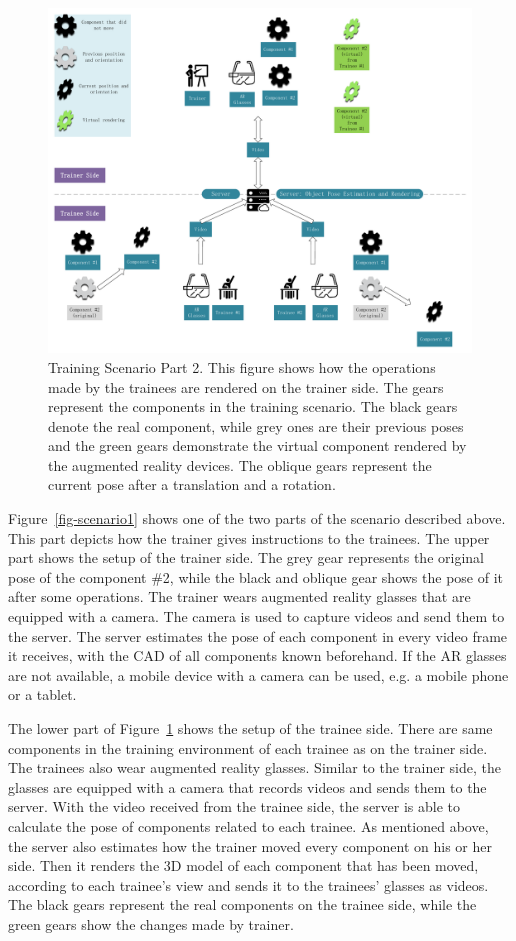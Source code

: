 \begin{figure}
	\centering
	\includegraphics[width=\textwidth]{figures/scenario2.pdf}
	\caption{Training Scenario Part 2. This figure shows how the operations made by the trainees are rendered on the trainer side. The gears represent the components in the training scenario. The black gears denote the real component, while grey ones are their previous poses and the green gears demonstrate the virtual component rendered by the augmented reality devices. The oblique gears represent the current pose after a translation and a rotation.}
	\label{fig-scenario2}
\end{figure}

Figure~\ref{fig-scenario1} shows one of the two parts of the scenario described above. This part depicts how the trainer gives instructions to the trainees.
The upper part shows the setup of the trainer side. The grey gear represents the original pose of the component  \#2, while the black and oblique gear shows the pose of it after some operations.
The trainer wears augmented reality glasses that are equipped with a camera. The camera is used to capture videos and send them to the server.
The server estimates the pose of each component in every video frame it receives, with the CAD of all components known beforehand.
If the AR glasses are not available, a mobile device with a camera can be used, e.g. a mobile phone or a tablet.

The lower part of Figure~\ref{fig-scenario2} shows the setup of the trainee side.
There are same components in the training environment of each trainee as on the trainer side.
The trainees also wear augmented reality glasses.
Similar to the trainer side, the glasses are equipped with a camera that records videos and sends them to the server. With the video received from the trainee side, the server is able to calculate the pose of components related to each trainee.
As mentioned above, the server also estimates how the trainer moved every component on his or her side. Then it renders the 3D model of each component that has been moved, according to each trainee's view and sends it to the trainees' glasses as videos.
The black gears represent the real components on the trainee side, while the green gears show the changes made by trainer.

